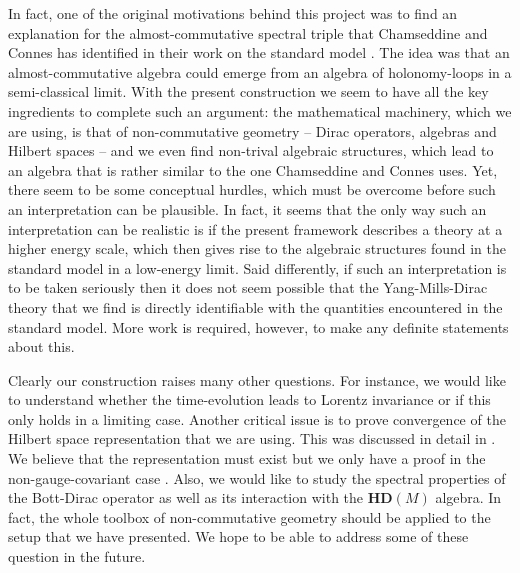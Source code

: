 \documentclass[letterpaper,11pt]{article}
\begin{document}
In fact, one of the original motivations behind this project \cite{Aastrup:2005yk} was to find an explanation for the almost-commutative spectral triple that Chamseddine and Connes has identified in their work on the standard model \cite{Connes:1996gi,Chamseddine:1991qh}. The idea was that an almost-commutative algebra could emerge from an algebra of holonomy-loops in a semi-classical limit. With the present construction we seem to have all the key ingredients to complete such an argument: the mathematical machinery, which we are using, is that of non-commutative geometry -- Dirac operators, algebras and Hilbert spaces -- and we even find non-trival algebraic structures, which lead to an algebra that is rather similar to the one Chamseddine and Connes uses. Yet, there seem to be some conceptual hurdles, which must be overcome before such an interpretation can be plausible. In fact, it seems that the only way such an interpretation can be realistic is if the present framework describes a theory at a higher energy scale, which then gives rise to the algebraic structures found in the standard model in a low-energy limit. Said differently, if such an interpretation is to be taken seriously then it does not seem possible that the Yang-Mills-Dirac theory that we find is directly identifiable with the quantities encountered in the standard model. More work is required, however, to make any definite statements about this.



Clearly our construction raises many other questions. For instance, we would like to understand whether the time-evolution leads to Lorentz invariance or if this only holds in a limiting case. Another critical issue is to prove convergence of the Hilbert space representation that we are using. This was discussed in detail in \cite{Aastrup:2019yui}. We believe that the representation must exist but we only have a proof in the non-gauge-covariant case \cite{Aastrup:2017vrm}. Also, we would like to study the spectral properties of the Bott-Dirac operator as well as its interaction with the $\mathbf{HD}(M)$ algebra. In fact, the whole toolbox of non-commutative geometry should be applied to the setup that we have presented. We hope to be able to address some of these question in the future.












\vspace{1cm}
\\
\end{document}
